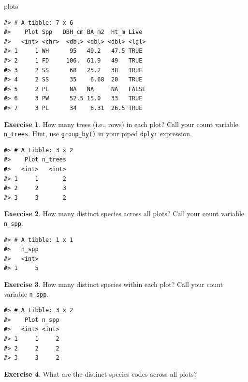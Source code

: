 \documentclass[
  11pt,
]{krantz}
\newenvironment{Shaded}{\begin{snugshade}}{\end{snugshade}}
\newcommand{\NormalTok}[1]{#1}
\theoremstyle{definition}
\theoremstyle{definition}
\theoremstyle{definition}
\newtheorem{exercise}{Exercise}[chapter]
\theoremstyle{definition}
\theoremstyle{remark}
\begin{document}
\begin{Shaded}
\begin{Highlighting}[]
\NormalTok{plots}
\end{Highlighting}
\end{Shaded}

\begin{verbatim}
#> # A tibble: 7 x 6
#>    Plot Spp   DBH_cm BA_m2  Ht_m Live 
#>   <int> <chr>  <dbl> <dbl> <dbl> <lgl>
#> 1     1 WH      95   49.2   47.5 TRUE 
#> 2     1 FD     106.  61.9   49   TRUE 
#> 3     2 SS      68   25.2   38   TRUE 
#> 4     2 SS      35    6.68  20   TRUE 
#> 5     2 PL      NA   NA     NA   FALSE
#> 6     3 PW      52.5 15.0   33   TRUE 
#> 7     3 PL      34    6.31  26.5 TRUE
\end{verbatim}

\begin{exercise}
\protect\hypertarget{exr:dplyr13}{}\label{exr:dplyr13}How many trees (i.e., rows) in each plot? Call your count variable \texttt{n\_trees}. Hint, use \texttt{group\_by()} in your piped \texttt{dplyr} expression.
\end{exercise}

\begin{verbatim}
#> # A tibble: 3 x 2
#>    Plot n_trees
#>   <int>   <int>
#> 1     1       2
#> 2     2       3
#> 3     3       2
\end{verbatim}

\begin{exercise}
\protect\hypertarget{exr:dplyr14}{}\label{exr:dplyr14}How many distinct species across all plots? Call your count variable \texttt{n\_spp}.
\end{exercise}

\begin{verbatim}
#> # A tibble: 1 x 1
#>   n_spp
#>   <int>
#> 1     5
\end{verbatim}

\begin{exercise}
\protect\hypertarget{exr:dplyr15}{}\label{exr:dplyr15}How many distinct species within each plot? Call your count variable \texttt{n\_spp}.
\end{exercise}

\begin{verbatim}
#> # A tibble: 3 x 2
#>    Plot n_spp
#>   <int> <int>
#> 1     1     2
#> 2     2     2
#> 3     3     2
\end{verbatim}

\begin{exercise}
\protect\hypertarget{exr:dplyr16}{}\label{exr:dplyr16}What are the distinct species codes across all plots?
\end{exercise}
\end{document}
